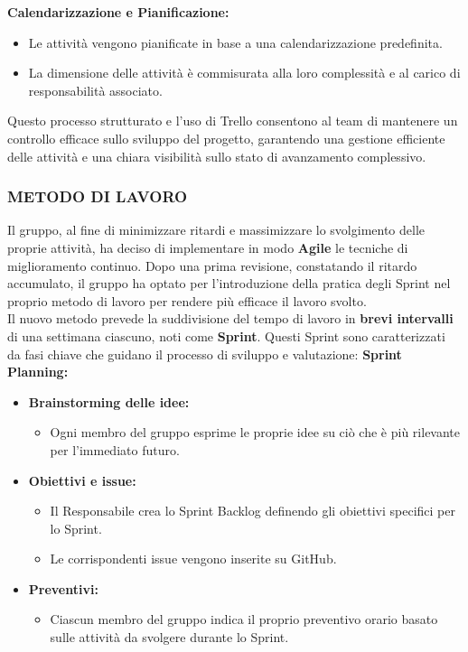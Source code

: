 \documentclass{article}
\begin{document}
\textbf{Calendarizzazione e Pianificazione:}
\begin{itemize}
    \item Le attività vengono pianificate in base a una calendarizzazione predefinita.
    \item La dimensione delle attività è commisurata alla loro complessità e al carico di responsabilità associato.
\end{itemize}
Questo processo strutturato e l'uso di Trello consentono al team di mantenere un controllo efficace sullo sviluppo del progetto, garantendo una gestione efficiente delle attività e una chiara visibilità sullo stato di avanzamento complessivo.
\subsubsection{METODO DI LAVORO}

Il gruppo, al fine di minimizzare ritardi e massimizzare lo svolgimento delle proprie attività, ha deciso di implementare in modo \textbf{Agile} le tecniche di miglioramento continuo. Dopo una prima revisione, constatando il ritardo accumulato, il gruppo ha optato per l'introduzione della pratica degli Sprint nel proprio metodo di lavoro per rendere più efficace il lavoro svolto.\\
Il nuovo metodo prevede la suddivisione del tempo di lavoro in \textbf{brevi intervalli} di una settimana ciascuno, noti come \textbf{Sprint}. Questi Sprint sono caratterizzati da fasi chiave che guidano il processo di sviluppo e valutazione:
\textbf{Sprint Planning:}
\begin{itemize}
    \item \textbf{Brainstorming delle idee:}
    \begin{itemize}
        \item Ogni membro del gruppo esprime le proprie idee su ciò che è più rilevante per l'immediato futuro.
    \end{itemize}
    \item \textbf{Obiettivi e issue:}
    \begin{itemize}
        \item Il Responsabile crea lo Sprint Backlog definendo gli obiettivi specifici per lo Sprint.
        \item Le corrispondenti issue vengono inserite su GitHub.
    \end{itemize}
    \item \textbf{Preventivi:}
    \begin{itemize}
        \item Ciascun membro del gruppo indica il proprio preventivo orario basato sulle attività da svolgere durante lo Sprint.
    \end{itemize}
\end{itemize}
\end{document}
